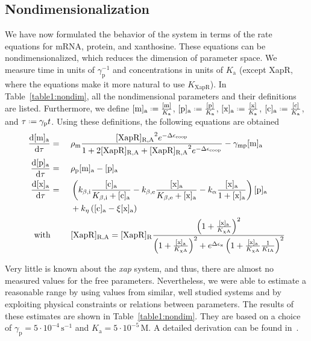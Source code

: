 \documentclass[10pt,letterpaper]{article}
\newcommand{\unit}[1]{\,\mathrm{#1}}
\newcommand{\n}[1]{\mathrm{#1}}
\newcommand{\dd}[2]{\frac{\mathrm{d} #1}{\mathrm{d} #2}}
\newcommand*{\defeq}{\mathrel{\vcenter{\baselineskip0.5ex \lineskiplimit0pt
			\hbox{\scriptsize.}\hbox{\scriptsize.}}}%
	=}
\begin{document}
	\subsection*{Nondimensionalization}
	We have now formulated the behavior of the system in terms of the rate
	equations for mRNA, protein, and xanthosine. These equations can be
	nondimensionalized, which reduces the dimension of parameter space. We
	measure time in units of $\gamma_{\n{p}}^{-1}$ and concentrations in units
	of $K_{\n{a}}$ (except XapR, where the equations make it more natural to use
	$K_{\n{XapR}}$). In Table~\ref{table1:nondim}, all the nondimensional
	parameters and their definitions are listed. Furthermore, we define
	$\n{[m]_a} \defeq \frac{\n{[m]}}{K_{\n{a}}}$, $\n{[p]_a} \defeq
	\frac{\n{[p]}}{K_{\n{a}}}$, $\n{[x]_a} \defeq \frac{\n{[x]}}{K_{\n{a}}}$,
	$\n{[c]_a} \defeq \frac{\n{[c]}}{K_{\n{a}}}$,
	and $\tau \defeq \gamma_{\n{p}} t$. Using these definitions, the following
	equations are obtained
	\begin{alignat}{2}
	\dd{\mathrm{[m]_a}}{\tau} &= \ &&
	\rho_{\n{m}} 
	\frac{
		\mathrm{[XapR]_{R,A}}^2 
		e^{- \Delta \epsilon_{\text{coop}}}
	}{
		1 + 
		2 \mathrm{[XapR]_{R,A}} +
		\mathrm{[XapR]_{R,A}}^2 e^{- \Delta \epsilon_{\text{coop}}}
	}
	- \gamma_{\n{mp}} \mathrm{[m]_a}
	\\
	\dd{\mathrm{[p]_a}}{\tau} &= \ &&
	\rho_{\n{p}} \mathrm{[m]_a}
	- \mathrm{[p]_a}
	\\
	\dd{\mathrm{[x]_a}}{\tau} &= \ && \left(k_{\n{\beta,i}} \frac{\n{[c]_a}}{K_{\n{\beta,i}} + \n{[c]_a}} - k_{\n{\beta,e}} \frac{\n{[x]_a}}{K_{\n{\beta,e}} + \n{[x]_a}} - k_{\n{\alpha}} \frac{\n{[x]_a}}{1 + \n{[x]_a}}\right) \mathrm{[p]_a} \\ & && + k_{\n{\eta}} \left(\mathrm{[c]_a} - \xi \mathrm{[x]_a}\right)
	\nonumber \\
	\text{with} & && \raggedleft [\n{XapR}]_{\mathrm{R,\n{A}}} = [\n{XapR}]_{\mathrm{R}} \frac{\left(1 + \frac{\mathrm{[x]_{\n{a}}}}{K_{\n{\chi A}}}\right)^2}{\left(1 + \frac{\mathrm{[x]_{\n{a}}}}{K_{\n{\chi A}}}\right)^2 + e^{\Delta \epsilon_{\n{x}}} \left(1+\frac{\mathrm{[x]_{\n{a}}}}{K_{\n{\chi A}}} \frac{1}{K_{\n{IA}}}\right)^2} \nonumber
	\end{alignat}
	
	Very little is known about the \emph{xap} system, and thus, there are almost no
	measured values for the free parameters. Nevertheless, we were able to
	estimate a reasonable range by using values from similar, well studied
	systems and by exploiting physical constraints or relations between parameters.
	The results of these estimates are shown in Table~\ref{table1:nondim}. They
	are based on a choice of $\gamma_{\n{p}} = 5 \cdot 10^{-4} \unit{s^{-1}}$
	and $K_{\n{a}} = 5 \cdot 10^{-5} \unit{M}$. A detailed derivation can be
	found in~. 
	
\end{document}
